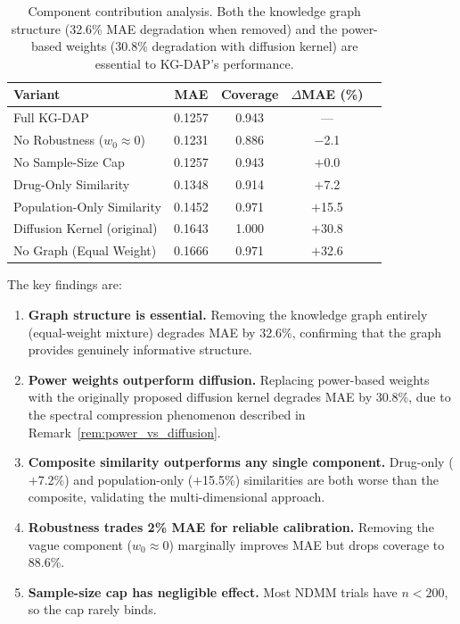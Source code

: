 \documentclass[12pt]{article}
\begin{document}
\begin{table}[t]
\centering
\caption{Component contribution analysis. Both the knowledge graph structure (32.6\% MAE degradation when removed) and the power-based weights (30.8\% degradation with diffusion kernel) are essential to KG-DAP's performance.}
\label{tab:ablation}
\begin{tabular}{lcccc}
\toprule
Variant & MAE & Coverage & $\Delta$MAE (\%) \\
\midrule
Full KG-DAP                   & 0.1257 & 0.943 & ---      \\
No Robustness ($w_0 \approx 0$) & 0.1231 & 0.886 & $-$2.1  \\
No Sample-Size Cap            & 0.1257 & 0.943 & $+$0.0  \\
Drug-Only Similarity          & 0.1348 & 0.914 & $+$7.2  \\
Population-Only Similarity    & 0.1452 & 0.971 & $+$15.5 \\
Diffusion Kernel (original)   & 0.1643 & 1.000 & $+$30.8 \\
No Graph (Equal Weight)       & 0.1666 & 0.971 & $+$32.6 \\
\bottomrule
\end{tabular}
\end{table}

The key findings are:

\begin{enumerate}
\item \textbf{Graph structure is essential.} Removing the knowledge graph entirely (equal-weight mixture) degrades MAE by 32.6\%, confirming that the graph provides genuinely informative structure.

\item \textbf{Power weights outperform diffusion.} Replacing power-based weights with the originally proposed diffusion kernel degrades MAE by 30.8\%, due to the spectral compression phenomenon described in Remark~\ref{rem:power_vs_diffusion}.

\item \textbf{Composite similarity outperforms any single component.} Drug-only ($+$7.2\%) and population-only ($+$15.5\%) similarities are both worse than the composite, validating the multi-dimensional approach.

\item \textbf{Robustness trades 2\% MAE for reliable calibration.} Removing the vague component ($w_0 \approx 0$) marginally improves MAE but drops coverage to 88.6\%.

\item \textbf{Sample-size cap has negligible effect.} Most NDMM trials have $n < 200$, so the cap rarely binds.
\end{enumerate}
\end{document}

